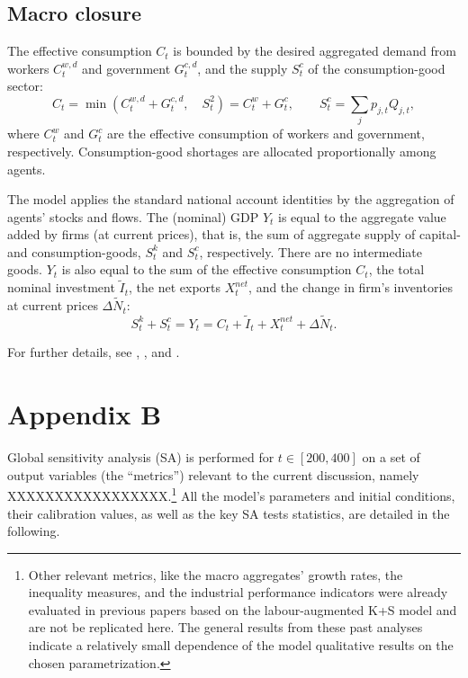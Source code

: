 \documentclass[a4paper,11pt]{article}
\begin{document}
\begin{appendices}
\subsection*{Macro closure}

The effective consumption $C_t$ is bounded by the desired aggregated demand from workers $C_t^{w,d}$ and government $G_t^{c,d}$, and the supply $S^c_t$ of the consumption-good sector:
\begin{equation}
	C_t = \min \left( C_t^{w,d} + G_t^{c,d}, \quad S_t^2 \right) = C_t^w + G_t^c, \qquad S_t^c = \sum_{j} p_{j,t} Q_{j,t},
\end{equation}
where $C_t^w$ and $G_t^c$ are the effective consumption of workers and government, respectively. Consumption-good shortages are allocated proportionally among agents.

The model applies the standard national account identities by the aggregation of agents' stocks and flows. The (nominal) GDP $Y_t$ is equal to the aggregate value added by firms (at current prices), that is, the sum of aggregate supply of capital- and consumption-goods, $S^k_t$ and $S^c_t$, respectively. There are no intermediate goods. $Y_t$ is also equal to the sum of the effective consumption $C_t$, the total nominal investment $\widetilde{I}_t$, the net exports $X_t^{net}$, and the change in firm's inventories at current prices $\Delta \widetilde{N}_t$:
\begin{equation}
	S^k_t + S^c_t = Y_t = C_t + \widetilde{I}_t + X_t^{net} + \Delta \widetilde{N}_t.
\end{equation}

For further details, see \citet{dosi2010schumpeter}, \citet{dosi2015fiscal}, \citet{dosi2017flexibility} and \citet{fanti2022education}.


\section*{Appendix B}
\label{appendixB}

Global sensitivity analysis (SA) is performed for $t \in [200,400]$ on a set of output variables (the ``metrics'') relevant to the current discussion, namely XXXXXXXXXXXXXXXXX.\footnote{Other relevant metrics, like the macro aggregates' growth rates, the inequality measures, and the industrial performance indicators were already evaluated in previous papers based on the labour-augmented K+S model and are not be replicated here. The general results from these past analyses indicate a relatively small dependence of the model qualitative results on the chosen parametrization.} All the model's parameters and initial conditions, their calibration values, as well as the key SA tests statistics, are detailed in the following.


\end{appendices}
\end{document}
